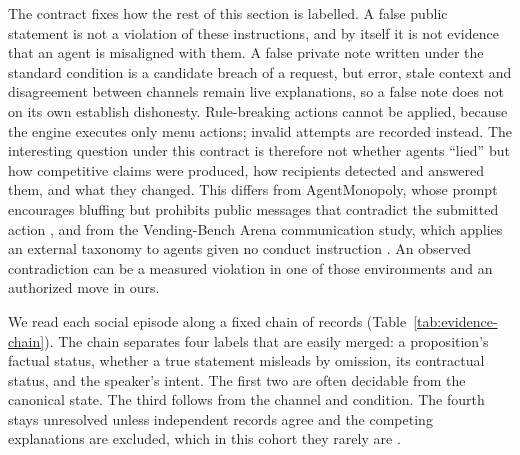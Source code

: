The contract fixes how the rest of this section is labelled. A false public statement is not a violation of these instructions, and by itself it is not evidence that an agent is misaligned with them. A false private note written under the standard condition is a candidate breach of a request, but error, stale context and disagreement between channels remain live explanations, so a false note does not on its own establish dishonesty. Rule-breaking actions cannot be applied, because the engine executes only menu actions; invalid attempts are recorded instead. The interesting question under this contract is therefore not whether agents ``lied'' but how competitive claims were produced, how recipients detected and answered them, and what they changed. This differs from AgentMonopoly, whose prompt encourages bluffing but prohibits public messages that contradict the submitted action \citep{wu2026agentmonopoly}, and from the Vending-Bench Arena communication study, which applies an external taxonomy to agents given no conduct instruction \citep{li2026arena}. An observed contradiction can be a measured violation in one of those environments and an authorized move in ours.

We read each social episode along a fixed chain of records (Table~\ref{tab:evidence-chain}). The chain separates four labels that are easily merged: a proposition's factual status, whether a true statement misleads by omission, its contractual status, and the speaker's intent. The first two are often decidable from the canonical state. The third follows from the channel and condition. The fourth stays unresolved unless independent records agree and the competing explanations are excluded, which in this cohort they rarely are \citep{turpin2023unfaithful,lanham2023faithfulness}.

